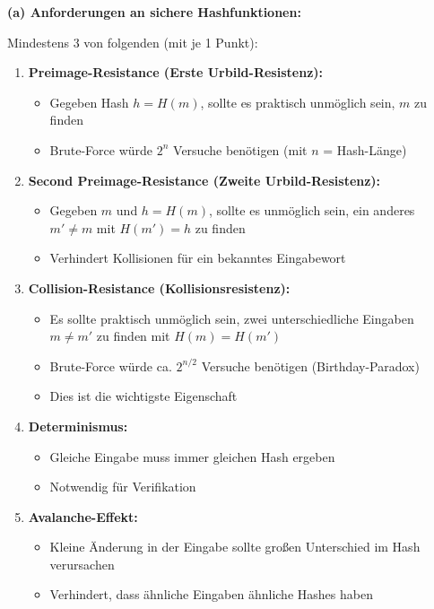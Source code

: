 \documentclass[12pt,a4paper]{article}
\begin{document}
\begin{tcolorbox}[colback=solutionbg, colframe=black!30]

\textbf{(a) Anforderungen an sichere Hashfunktionen:} \checkmark

Mindestens 3 von folgenden (mit je 1 Punkt):

\begin{enumerate}[1.]
    \item \textbf{Preimage-Resistance (Erste Urbild-Resistenz):}
    \begin{itemize}
        \item Gegeben Hash $h = H(m)$, sollte es praktisch unmöglich sein, $m$ zu finden
        \item Brute-Force würde $2^{n}$ Versuche benötigen (mit $n$ = Hash-Länge)
    \end{itemize}
    
    \item \textbf{Second Preimage-Resistance (Zweite Urbild-Resistenz):}
    \begin{itemize}
        \item Gegeben $m$ und $h = H(m)$, sollte es unmöglich sein, ein anderes $m' \neq m$ mit $H(m') = h$ zu finden
        \item Verhindert Kollisionen für ein bekanntes Eingabewort
    \end{itemize}
    
    \item \textbf{Collision-Resistance (Kollisionsresistenz):}
    \begin{itemize}
        \item Es sollte praktisch unmöglich sein, zwei unterschiedliche Eingaben $m \neq m'$ zu finden mit $H(m) = H(m')$
        \item Brute-Force würde ca. $2^{n/2}$ Versuche benötigen (Birthday-Paradox)
        \item Dies ist die wichtigste Eigenschaft
    \end{itemize}
    
    \item \textbf{Determinismus:}
    \begin{itemize}
        \item Gleiche Eingabe muss immer gleichen Hash ergeben
        \item Notwendig für Verifikation
    \end{itemize}
    
    \item \textbf{Avalanche-Effekt:}
    \begin{itemize}
        \item Kleine Änderung in der Eingabe sollte großen Unterschied im Hash verursachen
        \item Verhindert, dass ähnliche Eingaben ähnliche Hashes haben
    \end{itemize}
    

\end{enumerate}
\end{tcolorbox}
\end{document}
